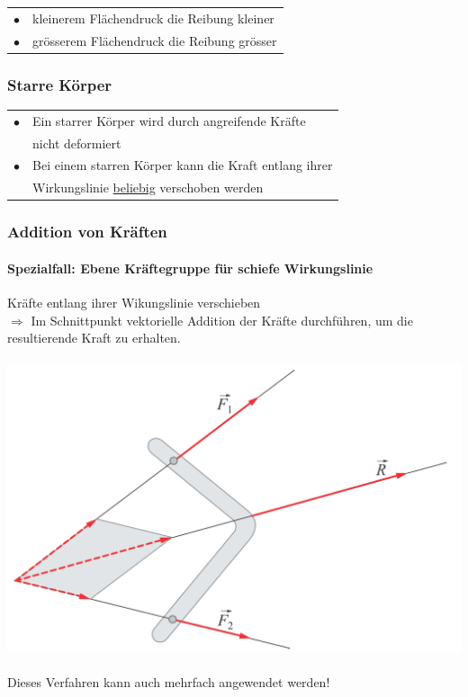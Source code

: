 		\begin{tabular}{ll}
		$\bullet$ & kleinerem Flächendruck die Reibung kleiner \\
		$\bullet$ & grösserem Flächendruck die Reibung grösser \\
		\end{tabular}
		
		
	
	
	
	\subsubsection{Starre Körper}
	
	\begin{tabular}{ll}
	$\bullet$ & Ein starrer Körper wird durch angreifende Kräfte \\
	& nicht deformiert \\
	$\bullet$ & Bei einem starren Körper kann die Kraft entlang ihrer  \\
	& Wirkungslinie \underline{beliebig} verschoben werden \\
	\end{tabular}
		
		
	\subsubsection{Addition von Kräften}
		
	
		\paragraph{Spezialfall: Ebene Kräftegruppe für schiefe Wirkungslinie}
		Kräfte entlang ihrer Wikungslinie verschieben \\
		$\Rightarrow$ Im Schnittpunkt vektorielle Addition der Kräfte durchführen, um die resultierende Kraft zu erhalten. \\
		\\
		\includegraphics[width=0.7\linewidth]{Bilder/schneidende_wirkungslinien} \\
		\\
		Dieses Verfahren kann auch mehrfach angewendet werden!
	
